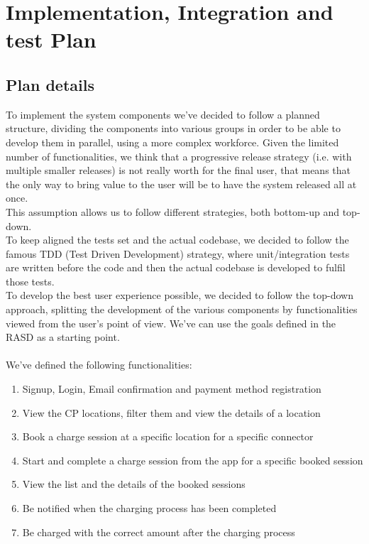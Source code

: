 \chapter{Implementation, Integration and test Plan}
\section{Plan details}
To implement the system components we've decided to follow a planned structure, dividing the components into various groups in order to be able to develop them in parallel, using a more complex workforce. Given the limited number of functionalities, we think that a progressive release strategy (i.e. with multiple smaller releases) is not really worth for the final user, that means that the only way to bring value to the user will be to have the system released all at once.\\
This assumption allows us to follow different strategies, both bottom-up and top-down. \\
To keep aligned the tests set and the actual codebase, we decided to follow the famous TDD (Test Driven Development) strategy, where unit/integration tests are written before the code and then the actual codebase is developed to fulfil those tests. \\
To develop the best user experience possible, we decided to follow the top-down approach, splitting the development of the various components by functionalities viewed from the user's point of view. We've can use the goals defined in the RASD as a starting point.\\\\
We've defined the following functionalities:
\begin{enumerate}
	\item Signup, Login, Email confirmation and payment method registration
	\item View the CP locations, filter them and view the details of a location
	\item Book a charge session at a specific location for a specific connector
	\item Start and complete a charge session from the app for a specific booked session
	\item View the list and the details of the booked sessions
	\item Be notified when the charging process has been completed
	\item Be charged with the correct amount after the charging process\\
\end{enumerate}

